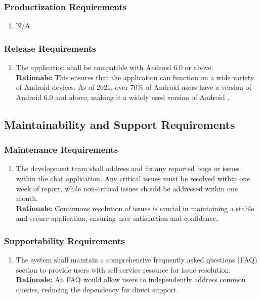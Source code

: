 \documentclass[]{article}
\begin{document}
\subsubsection{Productization Requirements}
\label{ssub:productization_requirements}
\begin{enumerate}[{OE-P}1. ]
    \item N/A
\end{enumerate}
\subsubsection{Release Requirements}
\label{ssub:release_requirements}
\begin{enumerate}[{OE-R}1. ]
    \item The application shall be compatible with Android 6.0 or above. \\
    {\bf Rationale:} This ensures that the application can function on a wide variety of Android devices.
    As of 2021, over 70\% of Android users have a version of Android 6.0 and above, making it a widely
    used version of Android \cite{8c}.
\end{enumerate}


\subsection{Maintainability and Support Requirements}
\label{sub:maintainability_and_support_requirements}
\subsubsection{Maintenance Requirements}
\label{ssub:maintenance_requirements}
\begin{enumerate}[{MS-M}1. ]
    \item The development team shall address and fix any reported bugs or issues within the chat application.
    Any critical issues must be resolved within one week of report, while non-critical issues should be addressed within one month. \\
    {\bf Rationale:} Continuous resolution of issues is crucial in maintaining a stable and secure application,
    ensuring user satisfaction and confidence.
\end{enumerate}
\subsubsection{Supportability Requirements}
\label{ssub:supportability_requirements}
\begin{enumerate}[{MS-S}1. ]
    \item The system shall maintain a comprehensive frequently asked questions (FAQ) section to provide users with self-service
    resource for issue resolution. \\
    {\bf Rationale:} An FAQ would allow users to independently address common queries, reducing the dependency for direct 
    support.
\end{enumerate}
\end{document}
